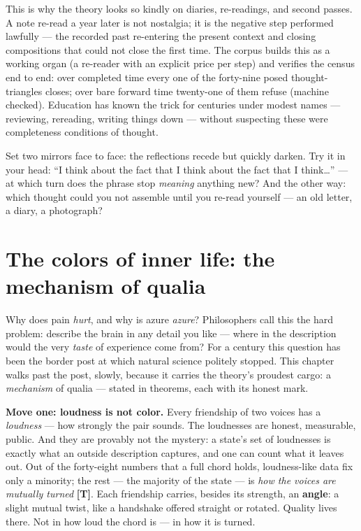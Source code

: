 \documentclass[11pt,letterpaper]{article}
\newcommand{\stT}{\textbf{[T]}\xspace}
\begin{document}
This is why the theory looks so kindly on diaries, re-readings, and
second passes. A note re-read a year later is not nostalgia; it is
the negative step performed lawfully --- the recorded past
re-entering the present context and closing compositions that could
not close the first time. The corpus builds this as a working organ
(a re-reader with an explicit price per step) and verifies the
census end to end: over completed time every one of the forty-nine
posed thought-triangles closes; over bare forward time twenty-one
of them refuse (machine checked). Education has known the trick for
centuries under modest names --- reviewing, rereading, writing
things down --- without suspecting these were completeness
conditions of thought.

\begin{askbox}
Set two mirrors face to face: the reflections recede but quickly
darken. Try it in your head: ``I think about the fact that I think
about the fact that I think\ldots'' --- at which turn does the phrase
stop \emph{meaning} anything new? And the other way: which thought
could you not assemble until you re-read yourself --- an old
letter, a diary, a photograph?
\end{askbox}

\section{The colors of inner life: the mechanism of qualia}
\label{sec:qualia}

Why does pain \emph{hurt}, and why is azure \emph{azure}?
Philosophers call this the hard problem: describe the brain in any
detail you like --- where in the description would the very
\emph{taste} of experience come from? For a century this question has
been the border post at which natural science politely stopped. This
chapter walks past the post, slowly, because it carries the theory's
proudest cargo: a \emph{mechanism} of qualia --- stated in theorems,
each with its honest mark.

\textbf{Move one: loudness is not color.} Every friendship of two
voices has a \emph{loudness} --- how strongly the pair sounds. The
loudnesses are honest, measurable, public. And they are provably not
the mystery: a state's set of loudnesses is exactly what an outside
description captures, and one can count what it leaves out. Out of
the forty-eight numbers that a full chord holds, loudness-like data
fix only a minority; the rest --- the majority of the state --- is
\emph{how the voices are mutually turned} \stT. Each friendship
carries, besides its strength, an \textbf{angle}: a slight mutual
twist, like a handshake offered straight or rotated. Quality lives
there. Not in how loud the chord is --- in how it is turned.
\end{document}
